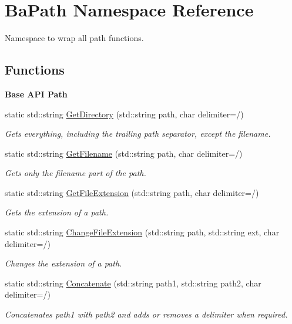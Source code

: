 \hypertarget{namespaceBaPath}{}\section{Ba\+Path Namespace Reference}
\label{namespaceBaPath}


Namespace to wrap all path functions.  


\subsection*{Functions}
\begin{Indent}\textbf{ Base A\+PI Path}\par
\begin{DoxyCompactItemize}
\item 
static std\+::string \hyperlink{namespaceBaPath_a565903d233aae8655f38347e3bb0a551}{Get\+Directory} (std\+::string path, char delimiter=\textquotesingle{}/\textquotesingle{})
\begin{DoxyCompactList}\small\item\em Gets everything, including the trailing path separator, except the filename. \end{DoxyCompactList}\item 
static std\+::string \hyperlink{namespaceBaPath_a7285e10c066bb8fb44faf97b709ad8ed}{Get\+Filename} (std\+::string path, char delimiter=\textquotesingle{}/\textquotesingle{})
\begin{DoxyCompactList}\small\item\em Gets only the filename part of the path. \end{DoxyCompactList}\item 
static std\+::string \hyperlink{namespaceBaPath_a96f0d430e53152e28075df8445cc676c}{Get\+File\+Extension} (std\+::string path, char delimiter=\textquotesingle{}/\textquotesingle{})
\begin{DoxyCompactList}\small\item\em Gets the extension of a path. \end{DoxyCompactList}\item 
static std\+::string \hyperlink{namespaceBaPath_a79ec43e1258100ad926c954d03ea06fb}{Change\+File\+Extension} (std\+::string path, std\+::string ext, char delimiter=\textquotesingle{}/\textquotesingle{})
\begin{DoxyCompactList}\small\item\em Changes the extension of a path. \end{DoxyCompactList}\item 
static std\+::string \hyperlink{namespaceBaPath_a2ef9e1a6ca9f3da675e9ed2362db0811}{Concatenate} (std\+::string path1, std\+::string path2, char delimiter=\textquotesingle{}/\textquotesingle{})
\begin{DoxyCompactList}\small\item\em Concatenates {\ttfamily path1} with {\ttfamily path2} and adds or removes a delimiter when required. \end{DoxyCompactList}\end{DoxyCompactItemize}
\end{Indent}


